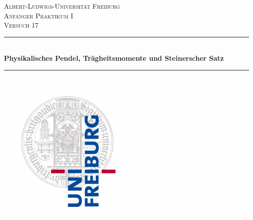 \documentclass[11pt,a4paper]{article}
\begin{document}
\newcommand*{\vertbar}{\rule[1ex]{0.5pt}{2.5ex}}
\newcommand*{\horzbar}{\rule[.5ex]{2.5ex}{0.5pt}}
\newcommand{\sg}{\vspace*{0.15cm}}
\newcommand{\pic}[4]{\begin{figure}[ht] \centering \texttt{[image: \#2]}\caption{#3}\label{#4}
\end{figure}}
\newcommand{\picoc}[3]{\begin{figure}[ht] \centering \texttt{[image: \#2]}\label{#3}
\end{figure}}

\begin{titlepage}

\newcommand{\HRule}{\rule{\linewidth}{0.5mm}} %

\center %


\textsc{\LARGE Albert-Ludwigs-Universität Freiburg}\\[1.5cm] %
\textsc{\Large Anfänger Praktikum I}\\[0.5cm] %
\textsc{\large Versuch 17}\\[0.5cm] %


\HRule \\[0.4cm]
{ \huge \bfseries   Physikalisches Pendel, Trägheitsmomente und Steinerscher Satz}\\[0.4cm] %
\HRule \\[1.5cm]


\includegraphics[width=200pt]{logo}\\[1cm]



\end{titlepage}
\end{document}
